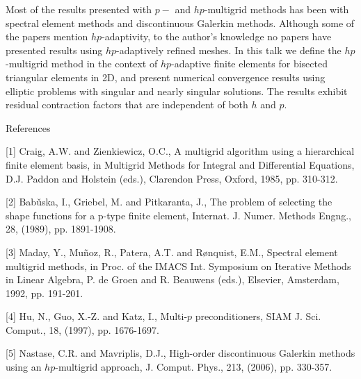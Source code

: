 \documentclass{report}
\begin{document}
Most of the results presented with $p-$ and $hp$-multigrid methods has
been with spectral element methods and discontinuous Galerkin methods.
Although some of the papers mention $hp$-adaptivity, to the author's
knowledge no papers have presented results using $hp$-adaptively refined
meshes. In this talk we define the $hp$-multigrid method in the context
of $hp$-adaptive finite elements for bisected triangular elements in 2D,
and present numerical convergence results using elliptic problems with
singular and nearly singular solutions. The results exhibit residual
contraction factors that are independent of both $h$ and $p$.

References

[1] Craig, A.W. and Zienkiewicz, O.C., A multigrid algorithm using a
hierarchical finite element basis, in Multigrid Methods for Integral and
Differential Equations, D.J. Paddon and Holstein (eds.), Clarendon Press,
Oxford, 1985, pp. 310-312.

[2] Bab{\v{u}}ska, I., Griebel, M. and Pitkaranta, J., The problem of
selecting the shape functions for a p-type finite element, Internat. J.
Numer. Methods Engng., 28, (1989), pp. 1891-1908.

[3] Maday, Y., Mu{\~{n}}oz, R., Patera, A.T. and R{\o}nquist, E.M.,
Spectral element multigrid methods, in Proc. of the IMACS Int. Symposium
on Iterative Methods in Linear Algebra, P. de Groen and R. Beauwens
(eds.), Elsevier, Amsterdam, 1992, pp. 191-201.

[4] Hu, N., Guo, X.-Z. and Katz, I., Multi-$p$ preconditioners, SIAM J.
Sci. Comput., 18, (1997), pp. 1676-1697.

[5] Nastase, C.R. and Mavriplis, D.J., High-order discontinuous Galerkin
methods using an $hp$-multigrid approach, J. Comput. Phys., 213, (2006),
pp. 330-357.
\end{document}
